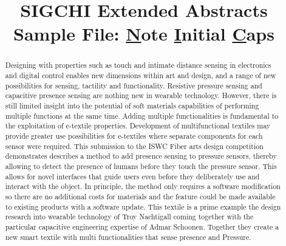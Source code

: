 \documentclass{sigchi-ext}
\title{SIGCHI Extended Abstracts Sample File: \underline{N}ote
  \underline{I}nitial \underline{C}aps}
\author{%
  \alignauthor{%
    \textbf{Troy Nachtigall}\\
    \affaddr{Eindhoven University of Technology} \\
    \affaddr{Eindhoven,  5400MB, NL} \\
    \email{t.r.nachtigall@tue.nl} }
    \alignauthor{%
    \textbf{A.M.J.M. Schoonen}\\
    \affaddr{Eindhoven, The Netherlands}\\
    \email{admar@familieschoonen.nl} } 
    }
\begin{document}
\maketitle

\RaggedRight{} 

\begin{abstract}
  Designing with properties such as touch and intimate distance 
  sensing in electronics and digital control enables new dimensions within art and design, and a range of new possibilities for sensing, tactility and functionality. Resistive pressure sensing and capacitive presence sensing are nothing new in wearable technology. However, there is still limited insight into the potential of soft materials capabilities of performing multiple functions at the same time. Adding multiple functionalities is fundamental to the exploitation of e-textile properties. Development of multifunctional textiles may provide greater use possibilities for e-textiles where separate components for each sensor were required. This submission to the ISWC Fiber arts design competition demonstrates describes a method to add presence sensing to
  pressure sensors, thereby allowing to detect the presence of humans before they touch the pressure sensor.  This allows for novel interfaces that guide
  users even before they deliberately use and interact with the object. In
  principle, the method only requires a software modification so there are no
  additional costs for materials and the feature could be made available to
  existing products with a software update.   This textile is a prime example the design research into wearable technology of Troy Nachtigall coming together with the particular capacitive engineering expertise of Admar Schoonen. Together they create a new smart textile with multi functionalities that sense presence and Pressure.  
\end{abstract}
\end{document}
